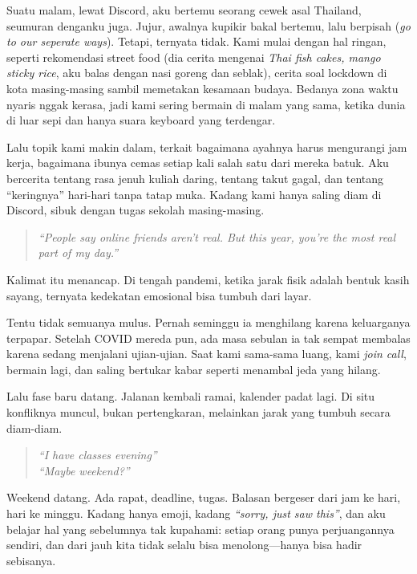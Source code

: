 \documentclass[
  letterpaper,
  DIV=11,
  numbers=noendperiod]{scrreprt}
\begin{document}
Suatu malam, lewat Discord, aku bertemu seorang cewek asal Thailand,
seumuran denganku juga. Jujur, awalnya kupikir bakal bertemu, lalu
berpisah (\emph{go to our seperate ways}). Tetapi, ternyata tidak. Kami
mulai dengan hal ringan, seperti rekomendasi street food (dia cerita
mengenai \emph{Thai fish cakes, mango sticky rice}, aku balas dengan
nasi goreng dan seblak), cerita soal lockdown di kota masing-masing
sambil memetakan kesamaan budaya. Bedanya zona waktu nyaris nggak
kerasa, jadi kami sering bermain di malam yang sama, ketika dunia di
luar sepi dan hanya suara keyboard yang terdengar.

Lalu topik kami makin dalam, terkait bagaimana ayahnya harus mengurangi
jam kerja, bagaimana ibunya cemas setiap kali salah satu dari mereka
batuk. Aku bercerita tentang rasa jenuh kuliah daring, tentang takut
gagal, dan tentang ``keringnya'' hari-hari tanpa tatap muka. Kadang kami
hanya saling diam di Discord, sibuk dengan tugas sekolah masing-masing.

\begin{quote}
\emph{``People say online friends aren't real. But this year, you're the
most real part of my day.''}
\end{quote}

Kalimat itu menancap. Di tengah pandemi, ketika jarak fisik adalah
bentuk kasih sayang, ternyata kedekatan emosional bisa tumbuh dari
layar.

Tentu tidak semuanya mulus. Pernah seminggu ia menghilang karena
keluarganya terpapar. Setelah COVID mereda pun, ada masa sebulan ia tak
sempat membalas karena sedang menjalani ujian-ujian. Saat kami sama-sama
luang, kami \emph{join call}, bermain lagi, dan saling bertukar kabar
seperti menambal jeda yang hilang.

Lalu fase baru datang. Jalanan kembali ramai, kalender padat lagi. Di
situ konfliknya muncul, bukan pertengkaran, melainkan jarak yang tumbuh
secara diam-diam.

\begin{quote}
\emph{``I have classes evening''}\\
\emph{``Maybe weekend?''}
\end{quote}

Weekend datang. Ada rapat, deadline, tugas. Balasan bergeser dari jam ke
hari, hari ke minggu. Kadang hanya emoji, kadang \emph{``sorry, just saw
this''}, dan aku belajar hal yang sebelumnya tak kupahami: setiap orang
punya perjuangannya sendiri, dan dari jauh kita tidak selalu bisa
menolong---hanya bisa hadir sebisanya.
\end{document}

